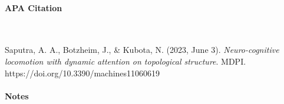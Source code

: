 \newpage

\vspace*{-0.5cm}
\paragraph{APA Citation} \

\begin{hangparas}{.25in}{1}
Saputra, A. A., Botzheim, J., \& Kubota, N. (2023, June 3). \textit{Neuro-cognitive locomotion with dynamic attention on topological structure}. MDPI. https://doi.org/10.3390/machines11060619
\end{hangparas}

\vspace*{-0.5cm}
\paragraph{Notes} \

